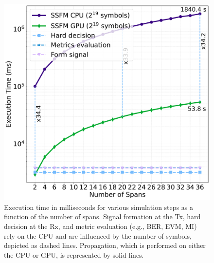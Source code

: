 \begin{figure}[t]
   \centering
        \includegraphics[width=0.7\linewidth]{images/hpcom/propagation.pdf}
    \caption{Execution time in milliseconds for various simulation steps as a function of the number of spans. Signal formation at the Tx, hard decision at the Rx, and metric evaluation (e.g., BER, EVM, MI) rely on the CPU and are influenced by the number of symbols, depicted as dashed lines. Propagation, which is performed on either the CPU or GPU, is represented by solid lines.}
    \label{fig:propagation_time}
\end{figure}




